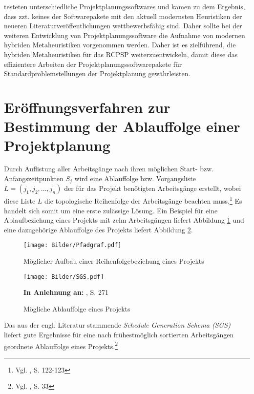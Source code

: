 \documentclass[a4paper,12pt,normalheadings,footexclude,headinclude,liststotoc,nochapterprefix,onecolumn,oneside,parskip,pointlessnumbers]{scrreprt}
\begin{document}
\cite{trautmann2009resource} testeten unterschiedliche Projektplanungssoftwares und kamen zu dem Ergebnis, dass zzt. keines der Softwarepakete mit den aktuell modernsten Heuristiken der neueren Literaturveröffentlichungen wettbewerbsfähig sind. Daher sollte bei der weiteren Entwicklung von Projektplanungssoftware die Aufnahme von modernen hybriden Metaheuristiken vorgenommen werden. Daher ist es zielführend, die hybriden Metaheuristiken für das RCPSP weiterzuentwickeln, damit diese das effizientere Arbeiten der Projektplanungssoftwarepakete für Standardproblemstellungen der Projektplanung gewährleisten.





\section{Eröffnungsverfahren zur Bestimmung der Ablauffolge einer Projektplanung} \label{SGS}
Durch Auflistung aller Arbeitsgänge nach ihren möglichen Start- bzw. Anfangszeitpunkten $S_{j}$ wird eine Ablauffolge bzw. Vorgangsliste $L=(j_{1},j_{2},...,j_{n})$ der für das Projekt benötigten Arbeitsgänge erstellt, wobei diese Liste $L$ die topologische Reihenfolge der Arbeitsgänge beachten muss.\footnote{Vgl. \cite{brucker2006complex}, S. 122-123\label{complex}} Es handelt sich somit um eine erste zulässige Lösung. Ein Beispiel für eine Ablaufbeziehung eines Projekts mit zehn Arbeitsgängen liefert Abbildung \ref{Pfad} und eine dazugehörige Ablauffolge des Projekts liefert Abbildung \ref{SGSBild}.

\begin{figure}[h!]
  \begin{center}
\texttt{[image: Bilder/Pfadgraf.pdf]}
 \caption{Möglicher Aufbau einer Reihenfolgebeziehung eines Projekts}\label{Pfad}
  \end{center}
\end{figure}
\begin{figure}[h!]
  \begin{center}
\texttt{[image: Bilder/SGS.pdf]}
 \caption{Mögliche Ablauffolge eines Projekts}\label{SGSBild}
   {\footnotesize  \textbf{In Anlehnung an:} \cite{bouleimen2003new}, S. 271}
  \end{center}
\end{figure}
Das aus der engl. Literatur stammende \textit{Schedule Generation Schema (SGS)} liefert gute Ergebnisse für eine nach frühestmöglich sortierten Arbeitsgängen geordnete Ablauffolge eines Projekts.\footnote{Vgl. \cite{kolisch2006experimental}, S. 33}
\end{document}
